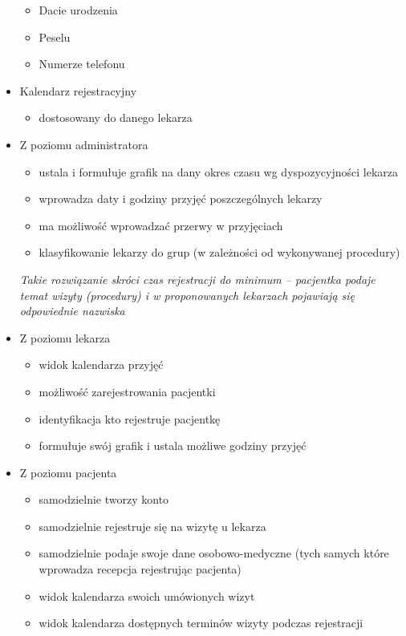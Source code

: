 \documentclass[polish,12pt]{aghthesis}
\begin{document}
\begin{itemize}
\begin{itemize}
        \item Dacie urodzenia
        \item Peselu
        \item Numerze telefonu
    \end{itemize}
    \item Kalendarz rejestracyjny \begin{itemize}
        \item dostosowany do danego lekarza
    \end{itemize}
    \item Z poziomu administratora \begin{itemize}
        \item ustala i formułuje grafik na dany okres czasu wg dyspozycyjności lekarza
        \item wprowadza daty i godziny przyjęć poszczególnych lekarzy 
        \item ma możliwość wprowadzać przerwy w przyjęciach 
        \item klasyfikowanie lekarzy do grup (w zależności od wykonywanej procedury)
    \end{itemize}
    \emph{Takie rozwiązanie skróci czas rejestracji do minimum – pacjentka podaje temat wizyty (procedury) i w proponowanych lekarzach pojawiają się odpowiednie nazwiska}
    \item Z poziomu lekarza \begin{itemize}
        \item widok kalendarza przyjęć
        \item możliwość zarejestrowania pacjentki 
        \item identyfikacja kto rejestruje pacjentkę
        \item formułuje swój grafik i ustala możliwe godziny przyjęć %
    \end{itemize}
    \item Z poziomu pacjenta \begin{itemize} %
      \item samodzielnie tworzy konto
      \item samodzielnie rejestruje się na wizytę u lekarza
      \item samodzielnie podaje swoje dane osobowo-medyczne (tych samych które wprowadza recepcja rejestrując pacjenta)
      \item widok kalendarza swoich umówionych wizyt
      \item widok kalendarza dostępnych terminów wizyty podczas rejestracji

\end{itemize}
\end{itemize}
\end{document}
